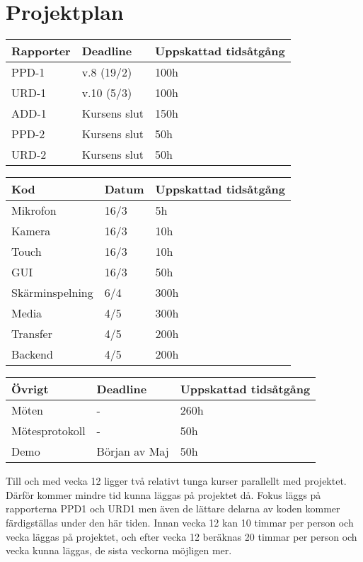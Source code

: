 
\section{Projektplan}

\begin{tabular}{ | l | l | l |}
  \hline
  Rapporter & Deadline & Uppskattad tidsåtgång \\ \hline
  PPD-1 & v.8 (19/2) & 100h \\ \hline
  URD-1 & v.10 (5/3) & 100h \\ \hline
  ADD-1 & Kursens slut & 150h \\ \hline
  PPD-2 & Kursens slut & 50h \\ \hline
  URD-2 & Kursens slut & 50h \\ \hline
\end{tabular}

\begin{tabular}{ | l | l | l |}
  \hline
  Kod & Datum & Uppskattad tidsåtgång \\ \hline
  Mikrofon & 16/3 & 5h \\ \hline
  Kamera & 16/3 & 10h  \\ \hline
  Touch & 16/3 & 10h \\ \hline
  GUI & 16/3 & 50h \\ \hline
  Skärminspelning & 6/4 & 300h \\ \hline
  Media & 4/5 & 300h \\ \hline
  Transfer & 4/5 & 200h \\ \hline
  Backend & 4/5 & 200h \\ \hline
\end{tabular}

\begin{tabular}{ | l | l | l | }
  \hline
  Övrigt & Deadline & Uppskattad tidsåtgång \\ \hline
  Möten & - & 260h \\ \hline
  Mötesprotokoll & - & 50h \\ \hline
  Demo & Början av Maj & 50h \\ \hline
\end{tabular}

Till och med vecka 12 ligger två relativt tunga kurser parallellt med projektet. Därför kommer mindre tid kunna läggas på projektet då. Fokus läggs på rapporterna PPD1 och URD1 men även de lättare delarna av koden kommer färdigställas under den här tiden. Innan vecka 12 kan 10 timmar per person och vecka läggas på projektet, och efter vecka 12 beräknas 20 timmar per person och vecka kunna läggas, de sista veckorna möjligen mer.


